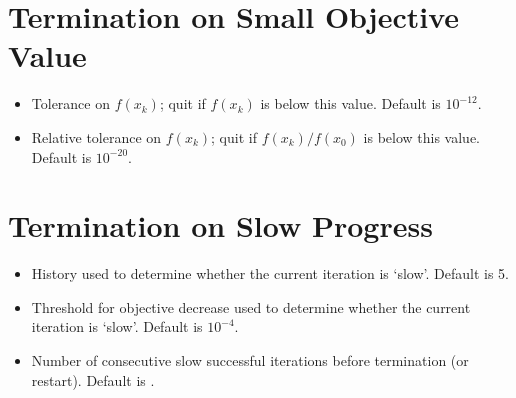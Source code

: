 \documentclass[letterpaper,10pt,english]{sphinxmanual}
\begin{document}
\section{Termination on Small Objective Value}
\label{\detokenize{advanced:termination-on-small-objective-value}}\begin{itemize}
\item {} 
 \sphinxhyphen{} Tolerance on \(f(x_k)\); quit if \(f(x_k)\) is below this value. Default is \(10^{-12}\).

\item {} 
 \sphinxhyphen{} Relative tolerance on \(f(x_k)\); quit if \(f(x_k)/f(x_0)\) is below this value. Default is \(10^{-20}\).

\end{itemize}


\section{Termination on Slow Progress}
\label{\detokenize{advanced:termination-on-slow-progress}}\begin{itemize}
\item {} 
 \sphinxhyphen{} History used to determine whether the current iteration is ‘slow’. Default is 5.

\item {} 
 \sphinxhyphen{} Threshold for objective decrease used to determine whether the current iteration is ‘slow’. Default is \(10^{-4}\).

\item {} 
 \sphinxhyphen{} Number of consecutive slow successful iterations before termination (or restart). Default is .

\end{itemize}
\end{document}
